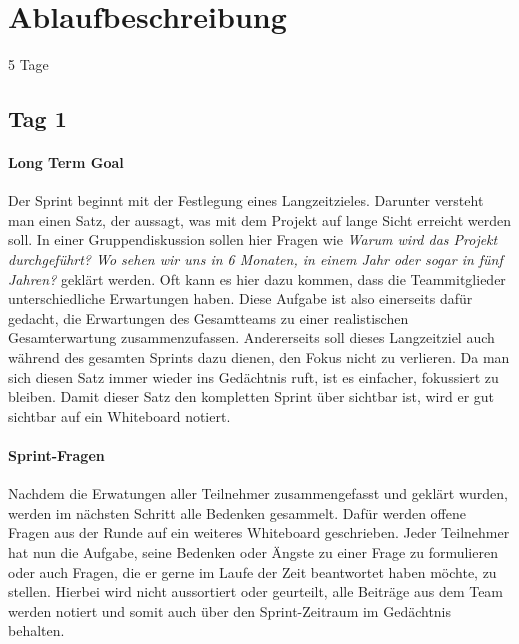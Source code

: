 \section{Ablaufbeschreibung}
5 Tage

\subsection*{Tag 1}
\paragraph{Long Term Goal}
Der Sprint beginnt mit der Festlegung eines Langzeitzieles. Darunter versteht man einen Satz, der aussagt, was mit dem Projekt auf lange Sicht erreicht werden soll. In einer Gruppendiskussion sollen hier Fragen wie \textit{Warum wird das Projekt durchgeführt? Wo sehen wir uns in 6 Monaten, in einem Jahr oder sogar in fünf Jahren?} geklärt werden. Oft kann es hier dazu kommen, dass die Teammitglieder unterschiedliche Erwartungen haben. Diese Aufgabe ist also einerseits dafür gedacht, die Erwartungen des Gesamtteams zu einer realistischen Gesamterwartung zusammenzufassen. Andererseits soll dieses Langzeitziel auch während des gesamten Sprints dazu dienen, den Fokus nicht zu verlieren. Da man sich diesen Satz immer wieder ins Gedächtnis ruft, ist es einfacher, fokussiert zu bleiben. Damit dieser Satz den kompletten Sprint über sichtbar ist, wird er gut sichtbar auf ein Whiteboard notiert. 

\paragraph{Sprint-Fragen}
Nachdem die Erwatungen aller Teilnehmer zusammengefasst und geklärt wurden, werden im nächsten Schritt alle Bedenken gesammelt. Dafür werden offene Fragen aus der Runde auf ein weiteres Whiteboard geschrieben. Jeder Teilnehmer hat nun die Aufgabe, seine Bedenken oder Ängste zu einer Frage zu formulieren oder auch Fragen, die er gerne im Laufe der Zeit beantwortet haben möchte, zu stellen. Hierbei wird nicht aussortiert oder geurteilt, alle Beiträge aus dem Team werden notiert und somit auch über den Sprint-Zeitraum im Gedächtnis behalten. 

